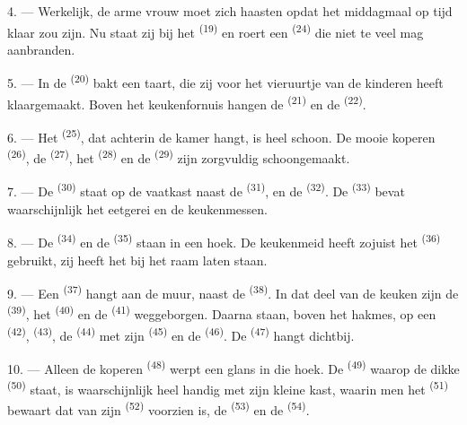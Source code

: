 4. --- Werkelijk, de arme vrouw moet zich haasten opdat het middagmaal op tijd klaar zou zijn.
Nu staat zij bij het  \textsuperscript{(19)} en roert een 
\textsuperscript{(24)} die niet te veel mag aanbranden.

5. --- In de  \textsuperscript{(20)} bakt een taart, die zij voor het vieruurtje
van de kinderen heeft klaargemaakt. Boven het keukenfornuis hangen de 
\textsuperscript{(21)} en de
 \textsuperscript{(22)}.

\VUsaut{4.0mm}
\VUsaut{3.0mm}

6. --- Het  \textsuperscript{(25)}, dat achterin de kamer hangt, is heel
schoon. De mooie koperen  \textsuperscript{(26)}, de 
\textsuperscript{(27)}, het
 \textsuperscript{(28)} en de 
\textsuperscript{(29)} zijn zorgvuldig schoongemaakt.

7. --- De  \textsuperscript{(30)} staat op de vaatkast naast de
 \textsuperscript{(31)}, en de 
\textsuperscript{(32)}. De  \textsuperscript{(33)} bevat waarschijnlijk het
eetgerei en de keukenmessen.

8. --- De  \textsuperscript{(34)} en de  \textsuperscript{(35)}
staan in een hoek. De keukenmeid heeft zojuist het
 \textsuperscript{(36)} gebruikt, zij heeft het bij het raam
laten staan.

9. --- Een  \textsuperscript{(37)} hangt aan de muur, naast de
 \textsuperscript{(38)}. In dat deel van de keuken zijn de
 \textsuperscript{(39)}, het 
\textsuperscript{(40)} en de  \textsuperscript{(41)} weggeborgen. Daarna
staan, boven het hakmes, op een  \textsuperscript{(42)}, 
\textsuperscript{(43)}, de
 \textsuperscript{(44)} met zijn 
\textsuperscript{(45)} en de  \textsuperscript{(46)}. De
 \textsuperscript{(47)} hangt dichtbij.

10. --- Alleen de koperen  \textsuperscript{(48)} werpt een glans in die hoek.
De  \textsuperscript{(49)} waarop de dikke
 \textsuperscript{(50)} staat, is waarschijnlijk heel handig met
zijn kleine kast, waarin men het  \textsuperscript{(51)} bewaart dat van
zijn  \textsuperscript{(52)} voorzien is, de
 \textsuperscript{(53)} en de 
\textsuperscript{(54)}.

